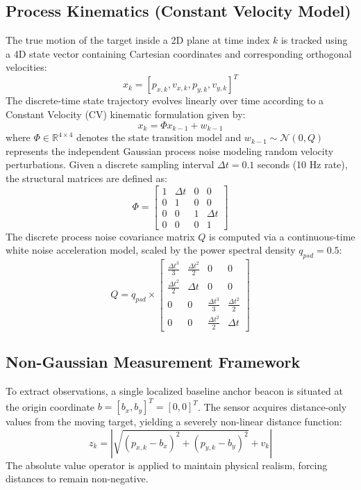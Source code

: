 \documentclass[10pt,twocolumn,a4paper]{article}
\begin{document}
\subsection{Process Kinematics (Constant Velocity Model)}
The true motion of the target inside a 2D plane at time index $k$ is tracked using a 4D state vector containing Cartesian coordinates and corresponding orthogonal velocities:
\begin{equation}
    x_{k} = [p_{x,k}, v_{x,k}, p_{y,k}, v_{y,k}]^{T}
\end{equation}
The discrete-time state trajectory evolves linearly over time according to a Constant Velocity (CV) kinematic formulation given by:
\begin{equation}
    x_{k} = \Phi x_{k-1} + w_{k-1}
\end{equation}
where $\Phi \in \mathbb{R}^{4 \times 4}$ denotes the state transition model and $w_{k-1} \sim \mathcal{N}(0, Q)$ represents the independent Gaussian process noise modeling random velocity perturbations. Given a discrete sampling interval $\Delta t = 0.1$ seconds (10 Hz rate), the structural matrices are defined as:
\begin{equation}
    \Phi = \begin{bmatrix} 1 & \Delta t & 0 & 0 \\ 0 & 1 & 0 & 0 \\ 0 & 0 & 1 & \Delta t \\ 0 & 0 & 0 & 1 \end{bmatrix}
\end{equation}
The discrete process noise covariance matrix $Q$ is computed via a continuous-time white noise acceleration model, scaled by the power spectral density $q_{psd} = 0.5$:
\begin{equation}
    Q = q_{psd} \times \begin{bmatrix} \frac{\Delta t^3}{3} & \frac{\Delta t^2}{2} & 0 & 0 \\ \frac{\Delta t^2}{2} & \Delta t & 0 & 0 \\ 0 & 0 & \frac{\Delta t^3}{3} & \frac{\Delta t^2}{2} \\ 0 & 0 & \frac{\Delta t^2}{2} & \Delta t \end{bmatrix}
\end{equation}

\subsection{Non-Gaussian Measurement Framework}
To extract observations, a single localized baseline anchor beacon is situated at the origin coordinate $b = [b_x, b_y]^T = [0, 0]^T$. The sensor acquires distance-only values from the moving target, yielding a severely non-linear distance function:
\begin{equation}
    z_{k} = \left| \sqrt{(p_{x,k} - b_{x})^{2} + (p_{y,k} - b_{y})^{2}} + v_{k} \right|
\end{equation}
The absolute value operator is applied to maintain physical realism, forcing distances to remain non-negative. 
\end{document}
